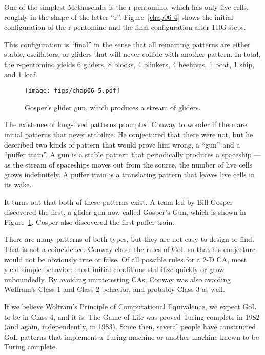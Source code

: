 \documentclass[12pt]{book}
\theoremstyle{exercise}
\begin{document}

One of the simplest Methuselahs is the
r-pentomino, which has only five cells, roughly in the shape of the
letter ``r''.  Figure~\ref{chap06-4} shows the initial configuration
of the r-pentomino and the final configuration after 1103 steps.

This configuration is ``final'' in the sense that all remaining
patterns are either stable, oscillators, or gliders that will never
collide with another pattern.  In total, the r-pentomino yields 6
gliders, 8 blocks, 4 blinkers, 4 beehives, 1 boat, 1 ship, and 1 loaf.



\begin{figure}
\centerline{\texttt{[image: figs/chap06-5.pdf]}}
\caption{Gosper's glider gun, which produces a stream of gliders.}
\label{chap06-5}
\end{figure}

The existence of long-lived patterns prompted Conway to wonder if
there are initial patterns that never stabilize.  He
conjectured that there were not, but he described two kinds of pattern
that would prove him wrong, a ``gun'' and a ``puffer train''.  A gun
is a stable pattern that periodically produces a spaceship --- as the
stream of spaceships moves out from the source, the number of live
cells grows indefinitely.  A puffer train is a translating pattern
that leaves live cells in its wake.


It turns out that both of these patterns exist.  A team led
by Bill Gosper discovered the first, a glider gun now called
Gosper's Gun, which is shown in Figure~\ref{chap06-5}.
Gosper also discovered the first puffer train.


There are many patterns of both types, but they are not easy to
design or find.  That is not a coincidence.  Conway chose the
rules of GoL so that his conjecture would not be obviously
true or false.  Of all possible rules for a 2-D CA, most
yield simple behavior: most initial conditions stabilize quickly
or grow unboundedly.  By avoiding uninteresting CAs, Conway
was also avoiding Wolfram's Class 1 and Class 2 behavior, and
probably Class 3 as well.

If we believe Wolfram's Principle of Computational Equivalence, we
expect GoL to be in Class 4, and it is.  The Game of Life was proved
Turing complete in 1982 (and again, independently, in 1983).
Since then, several people have constructed GoL patterns that implement
a Turing machine or another machine known to be Turing complete.
\end{document}

